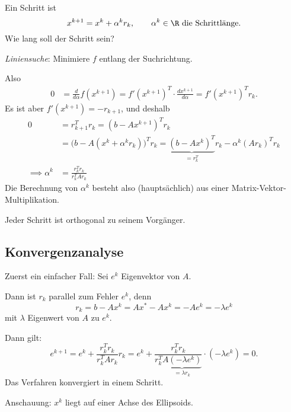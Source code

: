 Ein Schritt ist
\begin{equation}
\label{equa:gradient_step}
 x^{k+1}=x^k+\alpha^kr_k,
 \qquad
 \text{$\alpha^k \in \R$ die Schrittlänge.}
\end{equation}
Wie lang soll der Schritt sein?

\emph{Liniensuche}: Minimiere $f$ entlang der Suchrichtung.

Also
\begin{align*}
 0 & =\frac{d}{d \alpha} f (x^{k+1}) = f' (x^{k+1})^T \cdot \frac{dx^{k+1}}{d \alpha}
 =
 f' (x^{k+1})^T r_k.
\end{align*}
Es ist aber $f'(x^{k+1}) = -r_{k+1}$, und deshalb
\begin{align*}
 0 & = r_{k+1}^Tr_k = (b-Ax^{k+1})^T r_k \\
 & =
 \big(b-A (x^k+\alpha^kr_k) \big)^Tr_k
 =
 \underbrace{(b-Ax^k)^T}_{=r_k^T} r_k - \alpha^k (Ar_k)^Tr_k \\
 \implies \alpha^k & =\frac{r_k^Tr_k}{r_k^TAr_k}
\end{align*}
Die Berechnung von $\alpha^k$ besteht also (hauptsächlich) aus einer
Matrix-Vektor-Multiplikation.

Jeder Schritt ist orthogonal zu seinem Vorgänger.


\subsection{Konvergenzanalyse}

Zuerst ein einfacher Fall: Sei $e^k$ Eigenvektor von $A$.

Dann ist $r_k$ parallel zum Fehler $e^k$, denn
\begin{equation*}
 r_k=b-Ax^k=Ax^*-Ax^k=-Ae^k=-\lambda e^k
\end{equation*}
mit $\lambda$ Eigenwert von $A$ zu $e^k$.

Dann gilt:
\begin{equation*}
 e^{k+1}
 =
 e^k+\frac{r_k^Tr_k}{r_k^TAr_k}r_k
 =
 e^k+\frac{r_k^Tr_k}{r_k^T\underbrace{A (-\lambda e^k)}_{=\lambda r_k}} \cdot (-\lambda e^k )
 =
 0.
\end{equation*}
Das Verfahren konvergiert in einem Schritt.

Anschauung: $x^k$ liegt auf einer Achse des Ellipsoids.


